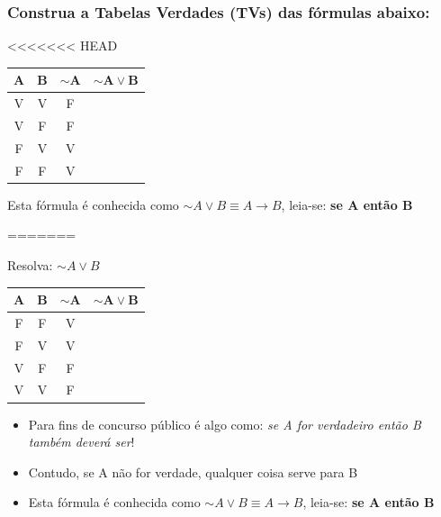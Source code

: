 \documentclass{beamer}
\begin{document}
\begin{frame}
\frametitle{Construa a Tabelas Verdades (TVs) das fórmulas abaixo:}
<<<<<<< HEAD
\begin{block}{}

	\begin{tabular}{|c|c|c|c|}
	\hline
	$\mathbf{A}$ & $\mathbf{B}$ & $\mathbf{\sim A}$ & $\mathbf{\sim A \vee B}$ \\
	\hline
	V & V & F & \\
	\hline
	V & F & F & \\
	\hline
	F & V & V & \\
	\hline
	F & F & V & \\
	\hline
	\end{tabular}
  
  Esta fórmula é conhecida como $\sim A \vee B \equiv A \rightarrow B$, leia-se: \textbf{se A  então B}
\end{block}
=======


\begin{block}{Resolva: $\sim A \vee B$}
\begin{center}

	\begin{tabular}{|c|c|c|c|}
	\hline 	\hline
	$\mathbf{A}$ & $\mathbf{B}$ & $\mathbf{\sim A}$ & $\mathbf{\sim A \vee B}$ \\
	\hline
	F & F & V & \\
  \hline
	F & V & V & \\
	\hline
	V & F & F & \\
	\hline
	V & V & F & \\
	\hline 	\hline
	\end{tabular}
\end{center}
  
\begin{itemize}
   \item Para fins de concurso público é algo como: \textit{se A for verdadeiro então B também deverá ser}!
   \item Contudo, se A não for verdade, qualquer coisa serve para B
    \item  Esta fórmula é conhecida como $\sim A \vee B \equiv A \rightarrow B$, leia-se: \textbf{se A  então B}

  \end{itemize}
  \end{block}


\end{frame}
\end{document}
